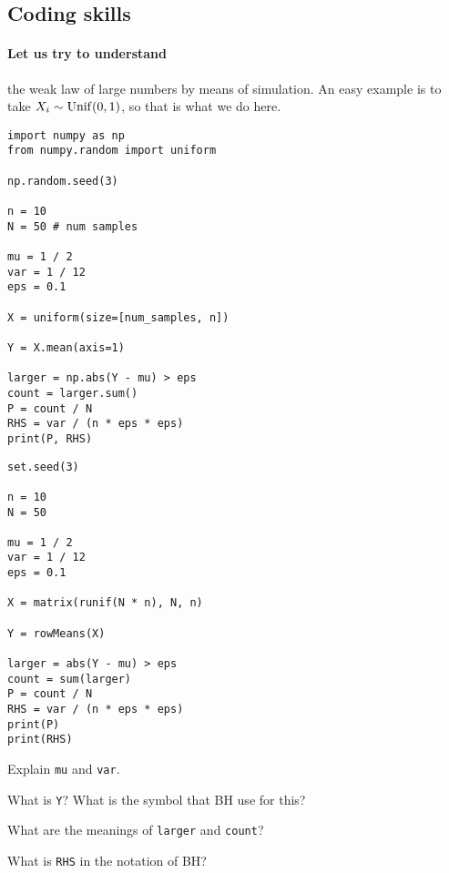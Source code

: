 \documentclass[assignments]{subfiles}
\begin{document}
\subsection{Coding skills}

\paragraph{Let us try to understand} the weak law of large numbers by means of simulation. An easy example is to take $X_{i}\sim\mathrm{Unif}(0,1)$, so that is what we do here.

\begin{verbatim}
import numpy as np
from numpy.random import uniform

np.random.seed(3)

n = 10
N = 50 # num samples

mu = 1 / 2
var = 1 / 12
eps = 0.1

X = uniform(size=[num_samples, n])

Y = X.mean(axis=1)

larger = np.abs(Y - mu) > eps
count = larger.sum()
P = count / N
RHS = var / (n * eps * eps)
print(P, RHS)
\end{verbatim}

\begin{verbatim}
set.seed(3)

n = 10
N = 50

mu = 1 / 2
var = 1 / 12
eps = 0.1

X = matrix(runif(N * n), N, n)

Y = rowMeans(X)

larger = abs(Y - mu) > eps
count = sum(larger)
P = count / N
RHS = var / (n * eps * eps)
print(P)
print(RHS)
\end{verbatim}


\begin{exercise}
Explain \texttt{mu} and \texttt{var}.
\end{exercise}

\begin{exercise}
What is \texttt{Y}? What is the symbol that BH use for this?
\end{exercise}

\begin{exercise}
What are the meanings of \texttt{larger} and \texttt{count}?
\end{exercise}

\begin{exercise}
What is \texttt{RHS} in the notation of BH?
\end{exercise}
\end{document}

